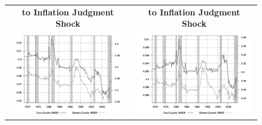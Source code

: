 \documentclass[12pt]{article}
\begin{document}
{\begin{figure}
\begin{tabular}{cc}
\textbf{to Inflation Judgment Shock} & \textbf{to Inflation Judgment Shock}  \\
\includegraphics[scale=0.17]{images/RMS16_Output_Gap_Inflation_Judgment_Shock.png} & \includegraphics[scale=0.17]{images/RMS16_Inflation_Inflation_Judgment_Shock.png} \\
\end{tabular}
\end{figure}

}
\end{document}
